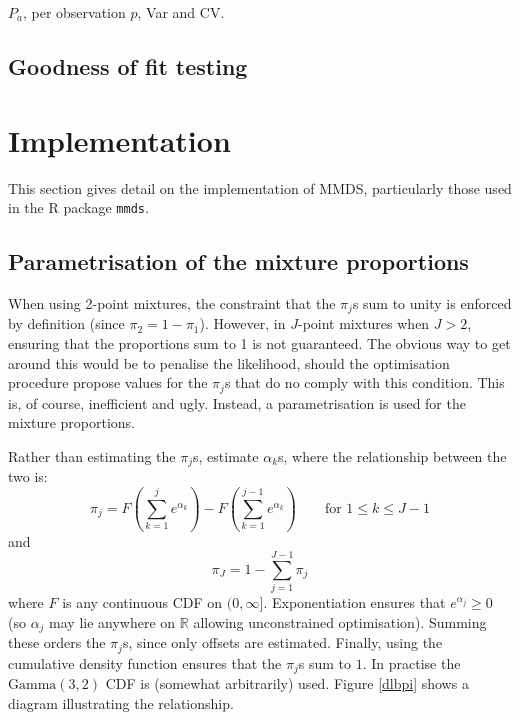 $P_a$, per observation $p$, Var and CV.

\subsection{Goodness of fit testing}





\section{Implementation}
This section gives detail on the implementation of MMDS, particularly those used in the \textsf{R} package \texttt{mmds}.


\subsection{Parametrisation of the mixture proportions}
When using 2-point mixtures, the constraint that the $\pi_j$s sum to unity is enforced by definition (since $\pi_2=1-\pi_1$). However, in $J$-point mixtures when $J>2$, ensuring that the proportions sum to 1 is not guaranteed. The obvious way to get around this would be to penalise the likelihood, should the optimisation procedure propose values for the $\pi_j$s that do no comply with this condition. This is, of course, inefficient and ugly. Instead, a parametrisation is used for the mixture proportions.

Rather than estimating the $\pi_j$s, estimate $\alpha_k$s, where the relationship between the two is:
\begin{equation*}
\pi_j = F(\sum_{k=1}^j e^{\alpha_k}) - F(\sum_{k=1}^{j-1} e^{\alpha_k}) \qquad \text{for } 1\leq k \leq J-1
\end{equation*}
and
\begin{equation*}
\pi_J = 1-\sum_{j=1}^{J-1} \pi_j
\end{equation*}
where $F$ is any continuous CDF on $(0,\infty]$. Exponentiation ensures that $e^{\alpha_j}\geq0$ (so $\alpha_j$ may lie anywhere on $\mathbb{R}$ allowing unconstrained optimisation). Summing these orders the $\pi_j$s, since only offsets are estimated. Finally, using the cumulative density function ensures that the $\pi_j$s sum to $1$. In practise the $\text{Gamma}(3,2)$ CDF is (somewhat arbitrarily) used. Figure \ref{dlbpi} shows a diagram illustrating the relationship.

